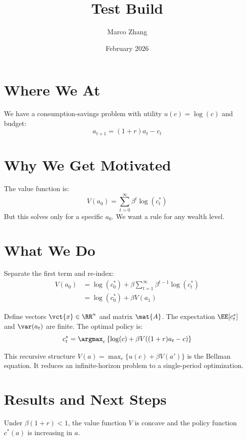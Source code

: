 \documentclass[oneside]{article}
\title{Test Build}
\author{Marco Zhang}
\date{February 2026}
\begin{document}
\maketitle

\section{Where We At}

We have a consumption-savings problem with utility $u(c) = \log(c)$ and budget:
\[
a_{t+1} = (1+r) a_t - c_t
\]

\section{Why We Get Motivated}

The value function is:
\[
V(a_0) = \sum_{t=0}^{\infty} \beta^t \log(c_t^*)
\]
But this solves only for a specific $a_0$. We want a rule for any wealth level.

\section{What We Do}

Separate the first term and re-index:
\begin{align}
V(a_0) &= \log(c_0^*) + \beta \sum_{t=1}^{\infty} \beta^{t-1} \log(c_t^*) \\
       &= \log(c_0^*) + \beta V(a_1)
\end{align}

Define vectors $\vct{x} \in \RR^n$ and matrix $\mat{A}$. The expectation $\EE[c_t^*]$ and $\var(a_t)$ are finite. The optimal policy is:
\[
c_t^* = \argmax_{c} \left\{ \log(c) + \beta V((1+r)a_t - c) \right\}
\]

\begin{remarkbox}
This recursive structure $V(a) = \max_c \{ u(c) + \beta V(a') \}$ is the Bellman equation. It reduces an infinite-horizon problem to a single-period optimization.
\end{remarkbox}

\section{Results and Next Steps}

\begin{theorem}
Under $\beta(1+r) < 1$, the value function $V$ is concave and the policy function $c^*(a)$ is increasing in $a$.
\end{theorem}
\end{document}
